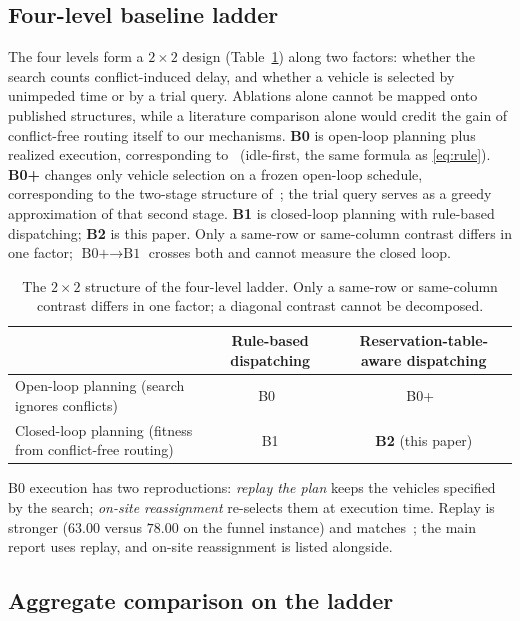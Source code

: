 \subsection{Four-level baseline ladder}
\label{sec:arms}

The four levels form a $2\times2$ design (Table~\ref{tab:arms}) along two factors: whether the search counts conflict-induced delay, and whether a vehicle is selected by unimpeded time or by a trial query.
Ablations alone cannot be mapped onto published structures, while a literature comparison alone would credit the gain of conflict-free routing itself to our mechanisms.
\textbf{B0} is open-loop planning plus realized execution, corresponding to~\cite{li2026framework} (idle-first, the same formula as \eqref{eq:rule}).
\textbf{B0+} changes only vehicle selection on a frozen open-loop schedule, corresponding to the two-stage structure of~\cite{sun2023integrated}; the trial query serves as a greedy approximation of that second stage.
\textbf{B1} is closed-loop planning with rule-based dispatching; \textbf{B2} is this paper.
Only a same-row or same-column contrast differs in one factor; $\text{B0+}\to\text{B1}$ crosses both and cannot measure the closed loop.

\begin{table}[t]
\caption{The $2\times2$ structure of the four-level ladder.
Only a same-row or same-column contrast differs in one factor; a diagonal contrast cannot be decomposed.}
\label{tab:arms}
\footnotesize
\begin{tabular}{@{}lcc@{}}
\toprule
 & Rule-based dispatching & Reservation-table-aware dispatching \\
\midrule
Open-loop planning (search ignores conflicts) & B0~\cite{li2026framework} & B0+~\cite{sun2023integrated} \\
Closed-loop planning (fitness from conflict-free routing) & B1 & \textbf{B2} (this paper) \\
\bottomrule
\end{tabular}
\end{table}

B0 execution has two reproductions: \emph{replay the plan} keeps the vehicles specified by the search; \emph{on-site reassignment} re-selects them at execution time.
Replay is stronger ($63.00$ versus $78.00$ on the funnel instance) and matches~\cite{li2026framework}; the main report uses replay, and on-site reassignment is listed alongside.

\subsection{Aggregate comparison on the ladder}
\label{sec:main}

